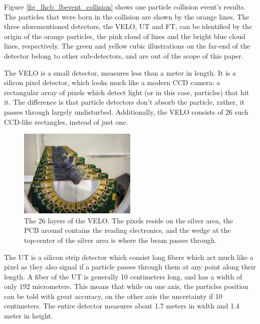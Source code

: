 \documentclass[12pt]{article}
\begin{document}
Figure \ref{fig_lhcb_lbevent_collision} shows one particle collision event's results. The particles that were born in the collision are shown by the orange lines. The three aforementioned detectors, the VELO, UT and FT, can be identified by the origin of the orange particles, the pink cloud of lines and the bright blue cloud lines, respectively. The green and yellow cubic illustrations on the far-end of the detector belong to other sub-detectors, and are out of the scope of this paper.

The VELO is a small detector, measures less than a meter in length. It is a silicon pixel detector, which looks much like a modern CCD camera: a rectangular array of pixels which detect light (or in this case, particles) that hit it. The difference is that particle detectors don't absorb the particle, rather, it passes through largely undisturbed. Additionally, the VELO consists of 26 such CCD-like rectangles, instead of just one.

\begin{figure}[H]
	\begin{center}
		\includegraphics[width=0.5\textwidth]{detector_velo_real}
	\end{center}
	\caption{The 26 layers of the VELO. The pixels reside on the silver area, the PCB around contains the reading electronics, and the wedge at the top-center of the silver area is where the beam passes through.}
	\label{fig_detector_velo_real}
\end{figure}

The UT is a silicon strip detector which consist long fibers which act much like a pixel as they also signal if a particle passes through them at any point along their length. A fiber of the UT is generally 10 centimeters long, and has a width of only 192 micrometers. This means that while on one axis, the particles position can be told with great accuracy, on the other axis the uncertainty if 10 centimeters. The entire detector measures about 1.7 meters in width and 1.4 meter in height.
\end{document}
